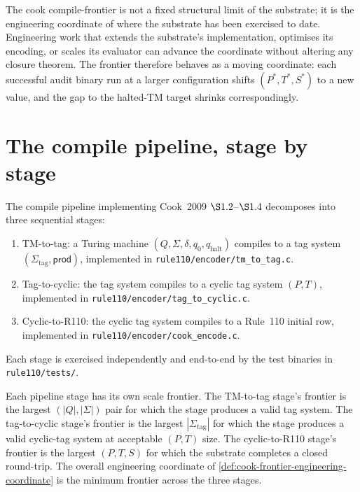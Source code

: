 \begin{principle}
\label{prin:cook-frontier-moving-coordinate}
The cook compile-frontier is not a fixed structural limit of the substrate; it is the engineering coordinate of where the substrate has been exercised to date. Engineering work that extends the substrate's implementation, optimises its encoding, or scales its evaluator can advance the coordinate without altering any closure theorem. The frontier therefore behaves as a moving coordinate: each successful audit binary run at a larger configuration shifts $(P^*, T^*, S^*)$ to a new value, and the gap to the halted-TM target shrinks correspondingly.
\end{principle}

\section{The compile pipeline, stage by stage}
\label{sec:cook-frontier-pipeline-stages}

\begin{definition}
\label{def:cook-frontier-pipeline-stages}
The compile pipeline implementing Cook~2009 \(\S 1.2\)--\(\S 1.4\) decomposes into three sequential stages:
\begin{enumerate}
\item TM-to-tag: a Turing machine $(Q, \Sigma, \delta, q_0, q_{\mathrm{halt}})$ compiles to a tag system $(\Sigma_{\mathrm{tag}}, \mathsf{prod})$, implemented in \texttt{rule110/encoder/tm\_to\_tag.c}.
\item Tag-to-cyclic: the tag system compiles to a cyclic tag system $(P, T)$, implemented in \texttt{rule110/encoder/tag\_to\_cyclic.c}.
\item Cyclic-to-R110: the cyclic tag system compiles to a Rule~110 initial row, implemented in \texttt{rule110/encoder/cook\_encode.c}.
\end{enumerate}
Each stage is exercised independently and end-to-end by the test binaries in \texttt{rule110/tests/}.
\end{definition}

\begin{remark}
\label{rem:cook-frontier-stagewise-scale}
Each pipeline stage has its own scale frontier. The TM-to-tag stage's frontier is the largest $(|Q|, |\Sigma|)$ pair for which the stage produces a valid tag system. The tag-to-cyclic stage's frontier is the largest $|\Sigma_{\mathrm{tag}}|$ for which the stage produces a valid cyclic-tag system at acceptable $(P, T)$ size. The cyclic-to-R110 stage's frontier is the largest $(P, T, S)$ for which the substrate completes a closed round-trip. The overall engineering coordinate of \autoref{def:cook-frontier-engineering-coordinate} is the minimum frontier across the three stages.
\end{remark}

